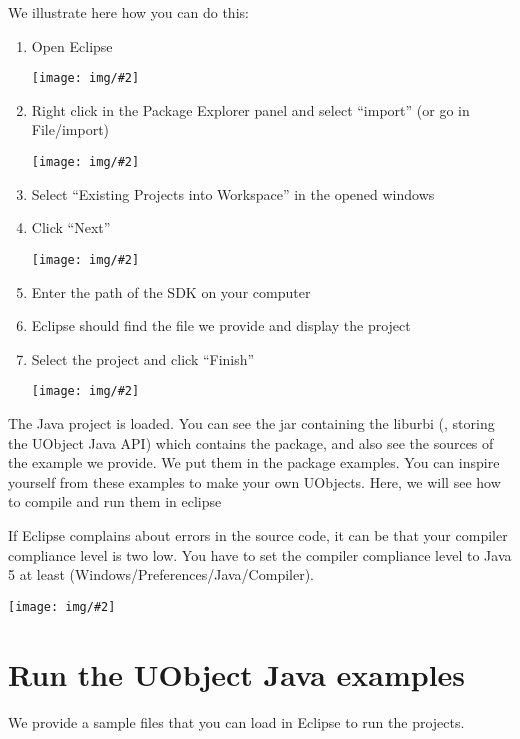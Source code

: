 \newcommand{\snapshot}[2][.6]{
  \begin{center}
    \texttt{[image: img/\#2]}
  \end{center}
}

We illustrate here how you can do this:

\begin{enumerate}
\item Open Eclipse

  \snapshot[.8]{eclipse-import}

\item Right click in the Package Explorer panel and select ``import'' (or go
  in File/import)

  \snapshot{select-import}

\item Select ``Existing Projects into Workspace'' in the opened windows
\item Click ``Next''

  \snapshot{select-proj}

\item Enter the path of the \urbi SDK on your computer
\item Eclipse should find the  file we provide and display
  the  project
\item Select the  project and click ``Finish''

  \snapshot[.8]{project-uobject-open}
\end{enumerate}

The Java project is loaded. You can see the jar containing the liburbi
(, storing the UObject Java API) which contains the
\urbi package, and also see the sources of the example we provide.  We put
them in the package examples.  You can inspire yourself from these examples
to make your own UObjects.  Here, we will see how to compile and run them in
eclipse

If Eclipse complains about errors in the source code, it can be that your
compiler compliance level is two low. You have to set the compiler
compliance level to Java 5 at least (Windows/Preferences/Java/Compiler).

\snapshot[.8]{compiler-compliance-level}


\section{Run the UObject Java examples}


We provide a sample  files that you can load in
Eclipse to run the projects.

